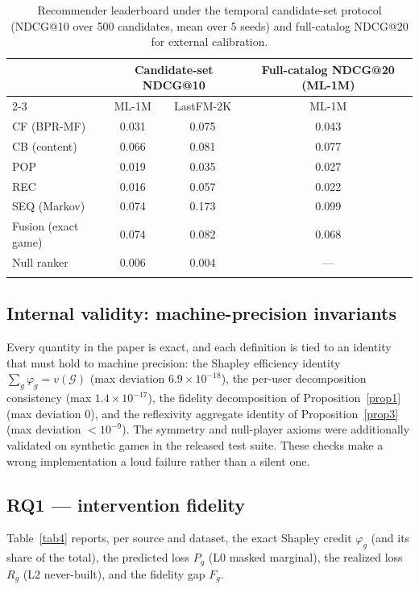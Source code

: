 \documentclass[pdflatex,sn-mathphys-num]{sn-jnl}
\theoremstyle{thmstyleone}%
\theoremstyle{thmstyletwo}%
\theoremstyle{thmstylethree}%
\newcommand{\Gset}{\mathcal{G}}
\newcommand{\reg}{R}
\newcommand{\pred}{P}
\begin{document}
\begin{table}[h]
\caption{Recommender leaderboard under the temporal candidate-set protocol (NDCG@10 over 500 candidates, mean over 5 seeds) and full-catalog NDCG@20 for external calibration.}
\label{tab3}
\begin{tabular*}{\textwidth}{@{\extracolsep\fill}lccc}
\toprule
 & \multicolumn{2}{c}{Candidate-set NDCG@10} & Full-catalog NDCG@20 (ML-1M) \\
\cmidrule{2-3}\cmidrule{4-4}
 & ML-1M & LastFM-2K & ML-1M \\
\midrule
CF (BPR-MF) & 0.031 & 0.075 & 0.043 \\
CB (content) & 0.066 & 0.081 & 0.077 \\
POP & 0.019 & 0.035 & 0.027 \\
REC & 0.016 & 0.057 & 0.022 \\
SEQ (Markov) & 0.074 & 0.173 & 0.099 \\
\midrule
Fusion (exact game) & 0.074 & 0.082 & 0.068 \\
Null ranker & 0.006 & 0.004 & --- \\
\botrule
\end{tabular*}
\end{table}

\subsection{Internal validity: machine-precision invariants}\label{subsec4_2}

Every quantity in the paper is exact, and each definition is tied to an identity that must hold to machine precision: the Shapley efficiency identity $\sum_g\varphi_g = v(\Gset)$ (max deviation $6.9\times10^{-18}$), the per-user decomposition consistency (max $1.4\times10^{-17}$), the fidelity decomposition of Proposition~\ref{prop1} (max deviation $0$), and the reflexivity aggregate identity of Proposition~\ref{prop3} (max deviation $<10^{-9}$). The symmetry and null-player axioms were additionally validated on synthetic games in the released test suite. These checks make a wrong implementation a loud failure rather than a silent one.

\subsection{RQ1 --- intervention fidelity}\label{subsec4_3}

Table~\ref{tab4} reports, per source and dataset, the exact Shapley credit $\varphi_g$ (and its share of the total), the predicted loss $\pred_g$ (L0 masked marginal), the realized loss $\reg_g$ (L2 never-built), and the fidelity gap $F_g$.
\end{document}
